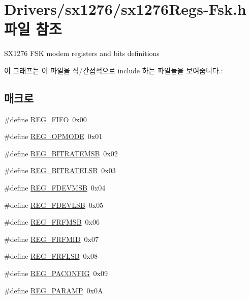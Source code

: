 \hypertarget{sx1276_regs-_fsk_8h}{}\section{Drivers/sx1276/sx1276\+Regs-\/\+Fsk.h 파일 참조}
\label{sx1276_regs-_fsk_8h}


S\+X1276 F\+SK modem registers and bits definitions  


이 그래프는 이 파일을 직/간접적으로 include 하는 파일들을 보여줍니다.\+:
\subsection*{매크로}
\begin{DoxyCompactItemize}
\item 
\#define \mbox{\hyperlink{sx1276_regs-_fsk_8h_a8ed1afe4fdc88a0f2626d9ee783e06e5}{R\+E\+G\+\_\+\+F\+I\+FO}}~0x00
\item 
\#define \mbox{\hyperlink{sx1276_regs-_fsk_8h_af3f25ba8cab1ad2c10ee96089d5a21be}{R\+E\+G\+\_\+\+O\+P\+M\+O\+DE}}~0x01
\item 
\#define \mbox{\hyperlink{sx1276_regs-_fsk_8h_a967024927a998c8b00e76015c0444d11}{R\+E\+G\+\_\+\+B\+I\+T\+R\+A\+T\+E\+M\+SB}}~0x02
\item 
\#define \mbox{\hyperlink{sx1276_regs-_fsk_8h_ab7321068986e253c5e0c4c00f592339b}{R\+E\+G\+\_\+\+B\+I\+T\+R\+A\+T\+E\+L\+SB}}~0x03
\item 
\#define \mbox{\hyperlink{sx1276_regs-_fsk_8h_ac9a9ad053f237a88ac9ef4e9f1eb6902}{R\+E\+G\+\_\+\+F\+D\+E\+V\+M\+SB}}~0x04
\item 
\#define \mbox{\hyperlink{sx1276_regs-_fsk_8h_a41b897af0ba110c4450e54887148acda}{R\+E\+G\+\_\+\+F\+D\+E\+V\+L\+SB}}~0x05
\item 
\#define \mbox{\hyperlink{sx1276_regs-_fsk_8h_a80711d5ed54cc1aa69666b92ea78c353}{R\+E\+G\+\_\+\+F\+R\+F\+M\+SB}}~0x06
\item 
\#define \mbox{\hyperlink{sx1276_regs-_fsk_8h_ad80489ab7d36cc8d9c725ab45f77c731}{R\+E\+G\+\_\+\+F\+R\+F\+M\+ID}}~0x07
\item 
\#define \mbox{\hyperlink{sx1276_regs-_fsk_8h_a3f6b75c6bcb9bb8631cd7fa7151dd934}{R\+E\+G\+\_\+\+F\+R\+F\+L\+SB}}~0x08
\item 
\#define \mbox{\hyperlink{sx1276_regs-_fsk_8h_a36b48e41982d4b0d0b6758a5e1ba398e}{R\+E\+G\+\_\+\+P\+A\+C\+O\+N\+F\+IG}}~0x09
\item 
\#define \mbox{\hyperlink{sx1276_regs-_fsk_8h_aff539bfb169523f9feb34a1d28daaa3f}{R\+E\+G\+\_\+\+P\+A\+R\+A\+MP}}~0x0A

\end{DoxyCompactItemize}

